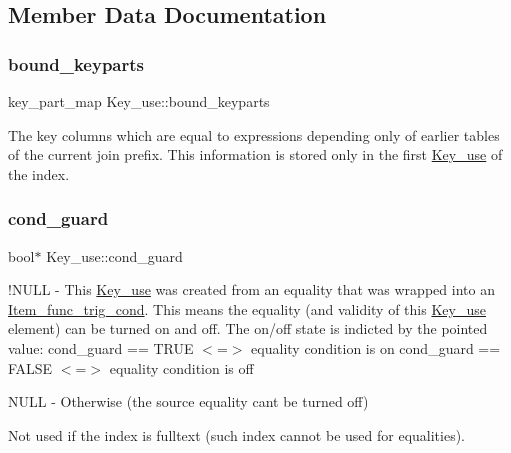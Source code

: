 \subsection{Member Data Documentation}
\mbox{\label{classKey__use_a0559be6fdc6c44e75d911049c2d61d0d}} 
\subsubsection{\texorpdfstring{bound\+\_\+keyparts}{bound\_keyparts}}
{\footnotesize\ttfamily key\+\_\+part\+\_\+map Key\+\_\+use\+::bound\+\_\+keyparts}

The key columns which are equal to expressions depending only of earlier tables of the current join prefix. This information is stored only in the first \mbox{\hyperlink{classKey__use}{Key\+\_\+use}} of the index. \mbox{\label{classKey__use_ae462d9f6aefe49c1907600a9921b02a6}} 
\subsubsection{\texorpdfstring{cond\+\_\+guard}{cond\_guard}}
{\footnotesize\ttfamily bool$\ast$ Key\+\_\+use\+::cond\+\_\+guard}

!\+N\+U\+LL -\/ This \mbox{\hyperlink{classKey__use}{Key\+\_\+use}} was created from an equality that was wrapped into an \mbox{\hyperlink{classItem__func__trig__cond}{Item\+\_\+func\+\_\+trig\+\_\+cond}}. This means the equality (and validity of this \mbox{\hyperlink{classKey__use}{Key\+\_\+use}} element) can be turned on and off. The on/off state is indicted by the pointed value\+: cond\+\_\+guard == T\+R\+UE $<$=$>$ equality condition is on cond\+\_\+guard == F\+A\+L\+SE $<$=$>$ equality condition is off

N\+U\+LL -\/ Otherwise (the source equality can\textquotesingle{}t be turned off)

Not used if the index is fulltext (such index cannot be used for equalities). \mbox{\label{classKey__use_aff1bd83706433a6e2ea488815989a951}} 
